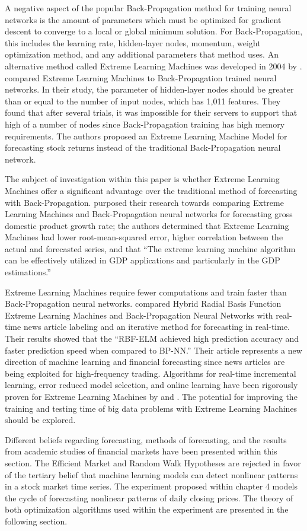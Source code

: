 A negative aspect of the popular Back-Propagation method for training neural networks is the amount of parameters which must be optimized for gradient descent to converge to a local or global minimum solution.
For Back-Propagation, this includes the learning rate, hidden-layer nodes, momentum, weight optimization method, and any additional parameters that method uses.
An alternative method called Extreme Learning Machines was developed in 2004 by \citet{Guang:2004}.
\citet{Li:2016} compared Extreme Learning Machines to Back-Propagation trained neural networks.
In their study, the parameter of hidden-layer nodes should be greater than or equal to the number of input nodes, which has 1,011 features.
They found that after several trials, it was impossible for their servers to support that high of a number of nodes since Back-Propagation training has high memory requirements.
The authors proposed an Extreme Learning Machine Model for forecasting stock returns instead of the traditional Back-Propagation neural network.

The subject of investigation within this paper is whether Extreme Learning Machines offer a significant advantage over the traditional method of forecasting with Back-Propagation.
\citet{Milacic:2017} purposed their research towards comparing Extreme Learning Machines and Back-Propagation neural networks for forecasting gross domestic product growth rate; the authors determined that Extreme Learning Machines had lower root-mean-squared error, higher correlation between the actual and forecasted series, and that ``The extreme learning machine algorithm can be effectively utilized in GDP applications and particularly in the GDP estimations.''

Extreme Learning Machines require fewer computations and train faster than Back-Propagation neural networks. \citet{Li:2016} compared Hybrid Radial Basis Function Extreme Learning Machines and Back-Propagation Neural Networks with real-time news article labeling and an iterative method for forecasting in real-time.
Their results showed that the ``RBF-ELM achieved high prediction accuracy and faster prediction speed when compared to BP-NN.'' Their article represents a new direction of machine learning and financial forecasting since news articles are being exploited for high-frequency trading.
Algorithms for real-time incremental learning, error reduced model selection, and online learning have been rigorously proven for Extreme Learning Machines by \citet{Guorui:2009} and \citet{Liang:2006}.
The potential for improving the training and testing time of big data problems with Extreme Learning Machines should be explored.

Different beliefs regarding forecasting, methods of forecasting, and the results from academic studies of financial markets have been presented within this section.
The Efficient Market and Random Walk Hypotheses are rejected in favor of the tertiary belief that machine learning models can detect nonlinear patterns in a stock market time series.
The experiment proposed within chapter 4 models the cycle of forecasting nonlinear patterns of daily closing prices.
The theory of both optimization algorithms used within the experiment are presented in the following section.

